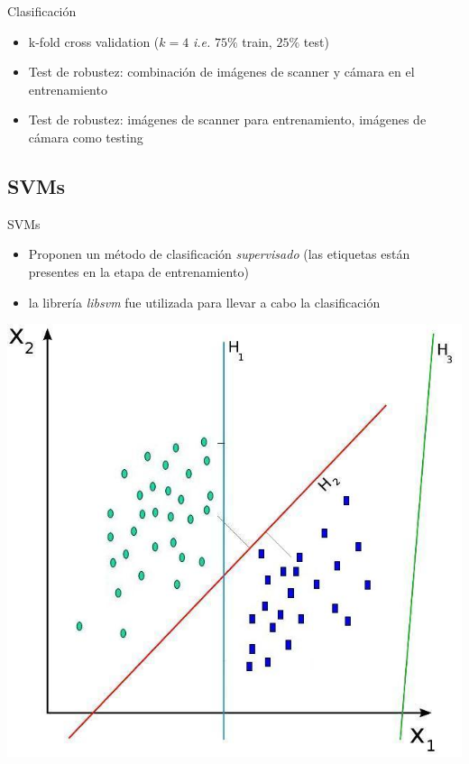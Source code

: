 \documentclass{beamer}
\begin{document}
\begin{frame}
{\huge Clasificaci\'on}
\begin{center}
\begin{itemize}
\item k-fold cross validation ($k = 4$ {\em i.e.} $75\%$ train, $25\%$ test)
\item Test de robustez: combinaci\'on de im\'agenes de scanner y c\'amara en el entrenamiento
\item Test de robustez: im\'agenes de scanner para entrenamiento, im\'agenes de c\'amara como testing
\end{itemize}
\end{center}
\end{frame}


\subsection{SVMs}
\begin{frame}
{\huge SVMs}
\begin{center}
\begin{itemize}
\item Proponen un m\'etodo de clasificaci\'on {\em supervisado} (las etiquetas est\'an presentes en la etapa de entrenamiento)
\item la librer\'ia {\em libsvm} fue utilizada para llevar a cabo la clasificaci\'on
\end{itemize}
\includegraphics[scale=0.28]{svm}
\end{center}
\end{frame}
\end{document}
